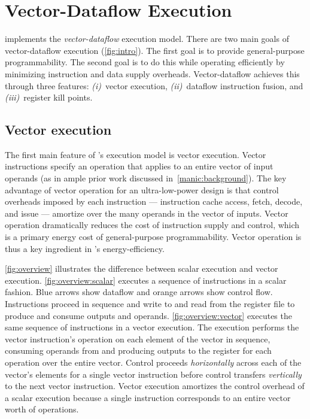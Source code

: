 \section{Vector-Dataflow Execution}
\label{manic:design}

\figMANICOverview

\manic implements the {\em vector-dataflow} execution model. There are
two main goals of vector-dataflow execution (\autoref{fig:intro}).
The first goal is to provide general-purpose programmability.  The
second goal is to do this while operating efficiently by minimizing
instruction and data supply overheads.
%
Vector-dataflow achieves this through three features:
\emph{(i)}~vector execution,
\emph{(ii)}~dataflow instruction fusion, and
\emph{(iii)}~register kill points.

\subsection{Vector execution}
The first main feature of \manic's execution model is vector execution. Vector
instructions specify an operation that applies to an entire vector of input
operands (as in ample prior work discussed in~\autoref{manic:background}).  The
key advantage of vector operation for an ultra-low-power design is that control overheads imposed by each
instruction --- instruction cache access, fetch, decode, and issue --- amortize
over the many operands in the vector of inputs.   Vector operation dramatically
reduces the cost of instruction supply and control, which is a primary energy cost of
general-purpose programmability.  Vector operation is thus a key ingredient in
\manic's energy-efficiency. 

\autoref{fig:overview} illustrates the difference between scalar execution
and vector execution.
%
\autoref{fig:overview:scalar} executes a sequence of instructions in a scalar fashion.
%
Blue arrows show dataflow and orange arrows show control flow.
%
Instructions proceed in sequence and write to and read from the register file
to produce and consume outputs and operands.
%
\autoref{fig:overview:vector} executes the same sequence of instructions in a vector execution.
%
The execution performs the vector instruction's operation on each element of
the vector in sequence, consuming operands from and producing outputs to the
register for each operation over the entire vector.
%
Control proceeds {\em horizontally} across each of the vector's elements for a
single vector instruction before control transfers {\em vertically} to the next
vector instruction.
%
Vector execution amortizes the control overhead of a scalar execution because a
single instruction corresponds to an entire vector worth of operations.
%

